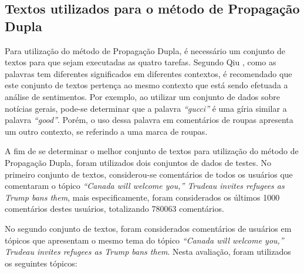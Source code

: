 \subsection{Textos utilizados para o método de Propagação Dupla}
\label{sec:textos}

Para utilização do método de Propagação Dupla, é necessário um
conjunto de textos para que sejam executadas as quatro tarefas. Segundo Qiu
\cite{Qiu:2011:OWE:1970420.1970422}, como as palavras tem diferentes
significados em diferentes contextos, é recomendado que este conjunto de textos
pertença ao mesmo contexto que está sendo efetuada a análise de sentimentos. Por
exemplo, ao utilizar um conjunto de dados sobre notícias gerais, pode-se
determinar que a palavra \textit{``gucci''} é uma gíria similar a palavra
\textit{``good''}. Porém, o uso dessa palavra em comentários de roupas
apresenta um outro contexto, se referindo a uma marca de roupas.

A fim de se determinar o melhor conjunto de textos para utilização do método de
Propagação Dupla, foram utilizados dois conjuntos de dados de testes. No
primeiro conjunto de textos, considerou-se comentários de todos os usuários que
comentaram o tópico \textit{``Canada will welcome you,” Trudeau invites
refugees as Trump bans them}, mais especificamente, foram considerados os
últimos 1000 comentários destes usuários, totalizando 780063 comentários.

No segundo
conjunto de textos, foram considerados comentários de usuários em tópicos
que apresentam o mesmo tema do tópico \textit{``Canada will welcome you,” Trudeau invites
refugees as Trump bans them}. Nesta avaliação, foram utilizados os
seguintes tópicos:

